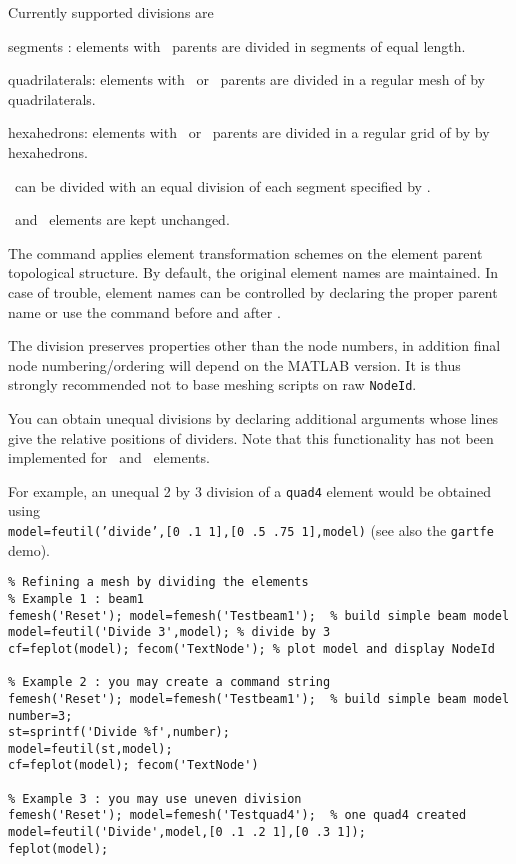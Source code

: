 Currently supported divisions are

\begin{Eitem}

\item segments : elements with \beam\ parents are divided in  segments of equal length.

\item quadrilaterals: elements with \quada\ or \quadb\ parents are divided in a regular mesh of  by  quadrilaterals.

\item hexahedrons: elements with \hexah\ or \hexav\ parents are divided in a regular grid of  by  by  hexahedrons.

\item \triaa\ can be divided with an equal division of each segment specified by .

\item \mass\ and \celas\ elements are kept unchanged.

\end{Eitem}

\noindent The  command applies element transformation schemes on the element parent topological structure. By default, the original element names are maintained. In case of trouble, element names can be controlled by declaring the proper parent name or use the  command before and after . 

The division preserves properties other than the node numbers, in addition final node numbering/ordering will depend on the MATLAB version. It is thus strongly recommended not to base meshing scripts on raw {\tt NodeId}.

You can obtain unequal divisions by declaring additional arguments whose lines give the relative positions of dividers. Note that this functionality has not been implemented for \quadb\ and \triaa\ elements.

For example, an unequal 2 by 3 division of a {\tt quad4} element would be obtained using\\
{\tt model=feutil('divide',[0 .1 1],[0 .5 .75 1],model)} (see also the {\tt gartfe} demo).

\begin{verbatim}
% Refining a mesh by dividing the elements
% Example 1 : beam1
femesh('Reset'); model=femesh('Testbeam1');  % build simple beam model
model=feutil('Divide 3',model); % divide by 3
cf=feplot(model); fecom('TextNode'); % plot model and display NodeId

% Example 2 : you may create a command string
femesh('Reset'); model=femesh('Testbeam1');  % build simple beam model
number=3;
st=sprintf('Divide %f',number);
model=feutil(st,model);
cf=feplot(model); fecom('TextNode')

% Example 3 : you may use uneven division
femesh('Reset'); model=femesh('Testquad4');  % one quad4 created
model=feutil('Divide',model,[0 .1 .2 1],[0 .3 1]); 
feplot(model);
\end{verbatim}%

